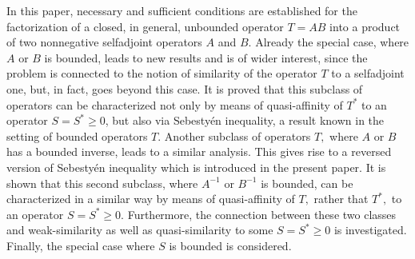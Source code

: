 \documentclass{amsart}
\newcommand{\adj}{^*}
\newcommand{\inv}{^{-1}}
\newcommand{\tstar}{T^{*}}
\numberwithin{equation}{section}
\begin{document}
\textbf{\abstractname}
In this paper, necessary and sufficient conditions are established  for the factorization of a closed, in general, unbounded  operator  $ T=AB$ into a product of two nonnegative selfadjoint operators $A$ and $B.$ Already the special case, where $A$ or $B$ is bounded, leads to new results and is of wider interest,  since the problem is connected to the notion of similarity of the operator $T$ to a selfadjoint one, but, in fact, goes beyond this case.    It is proved that this subclass of operators can be characterized not only by means of quasi-affinity of $\tstar$  to an operator $S=S\adj \geq 0$, but also via Sebestyén inequality, a result known in the   setting of bounded operators $T.$ Another subclass of operators $T,$ where $A$ or $B$ has a bounded inverse, leads to a similar analysis. This gives rise to a   reversed version of   Sebestyén  inequality which is introduced in the present paper.    It is   shown that this second subclass, where $A\inv$ or $B\inv$ is bounded, can be characterized in a similar way by means of quasi-affinity of $T,$ rather that $\tstar,$  to an operator $S=S\adj \geq 0$.  Furthermore,  the connection between these two classes and   weak-similarity as well as quasi-similarity  to  some $S =S\adj \geq 0$ is investigated. Finally, the special case where $ S$ is bounded is considered.\\ \\






\end{document}
